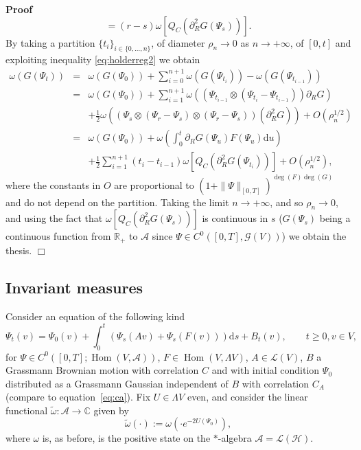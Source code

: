 \documentclass{article}
\newcommand{\assign}{:=}
\newcommand{\asterisk}{\mathord{*}}
\newcommand{\mathd}{\mathrm{d}}
\newcommand{\tmop}[1]{\ensuremath{\operatorname{#1}}}
\newenvironment{proof}{\noindent\textbf{Proof\ }}{\hspace*{\fill}$\Box$\medskip}
\begin{document}
\begin{proof}
  \[ = (r - s) \omega [Q_C (\partial_R^2 G (\Psi_s))] . \]
  By taking a partition $\{ t_i \}_{i \in \{ 0, \ldots, n \}}$, of diameter
  $\rho_n \rightarrow 0$ as $n \rightarrow + \infty$, of $[0, t]$ and
  exploiting inequality {\eqref{eq:holderreg2}} we obtain
  \[ \begin{array}{lll}
       \omega (G (\Psi_t)) & = & \omega (G (\Psi_0)) + \sum_{i = 0}^{n + 1}
       \omega (G (\Psi_{t_i})) - \omega (G (\Psi_{t_{i - 1}}))\\
       & = & \omega (G (\Psi_0)) + \sum_{i = 1}^{n + 1} \omega ((\Psi_{t_{i -
       1}} \otimes (\Psi_{t_i} - \Psi_{t_{i - 1}})) \partial_R G)\\
       &  & + \frac{1}{2} \omega ((\Psi_s \otimes (\Psi_r - \Psi_s) \otimes
       (\Psi_r - \Psi_s)) (\partial_R^2 G)) + O (\rho_n^{1 / 2})\\
       & = & \omega (G (\Psi_0)) + \omega \left( \int_0^t \partial_R G
       (\Psi_u) F (\Psi_u) \mathd u \right)\\
       &  & + \frac{1}{2} \sum_{i = 1}^{n + 1} (t_i - t_{i - 1}) \omega [Q_C
       (\partial_R^2 G (\Psi_{t_i}))] + O (\rho_n^{1 / 2}),
     \end{array} \]
  where the constants in $O$ are proportional to $(1 + \| \Psi \|_{[0,
  T]})^{\deg (F) \deg (G)}$ and do not depend on the partition. Taking the
  limit $n \rightarrow + \infty$, and so $\rho_n \rightarrow 0$, and using the
  fact that $\omega [Q_C (\partial_R^2 G (\Psi_s))]$ is continuous in $s$ ($G
  (\Psi_s)$ being a continuous function from $\mathbb{R}_+$ to $\mathcal{A}$
  since $\Psi \in C^0 ([0, T], \mathcal{G} (V))$) we obtain the thesis.
\end{proof}

\subsection{Invariant measures}

Consider an equation of the following kind
\begin{equation}
  \Psi_t (v) = \Psi_0 (v) + \int_0^t (\Psi_s (A v) + \Psi_s (F (v))) \mathd s
  + B_t (v), \qquad t \geqslant 0, v \in V, \label{eq:sde-langevin-0}
\end{equation}
for $\Psi \in C^0 ([0, T] ; \tmop{Hom} (V, \mathcal{A}))$, $F \in \tmop{Hom}
(V, \Lambda V)$, $A \in \mathcal{L} (V)$, $B$ a Grassmann Brownian motion with
correlation $C$ and with initial condition $\Psi_0$ distributed as a Grassmann
Gaussian independent of $B$ with correlation $C_A$ (compare to
equation~{\eqref{eq:ca}}). Fix $U \in \Lambda V$ even, and consider the linear
functional $\tilde{\omega} : \mathcal{A} \rightarrow \mathbb{C}$ given by
\begin{equation}
  \tilde{\omega} (\cdot) \assign \omega (\cdot e^{- 2 U (\Psi_0)}),
  \label{eq:gibbs-U}
\end{equation}
where $\omega$ is, as before, is the positive state on the $\asterisk$-algebra
$\mathcal{A} = \mathcal{L} (\mathcal{H})$.
\end{document}
